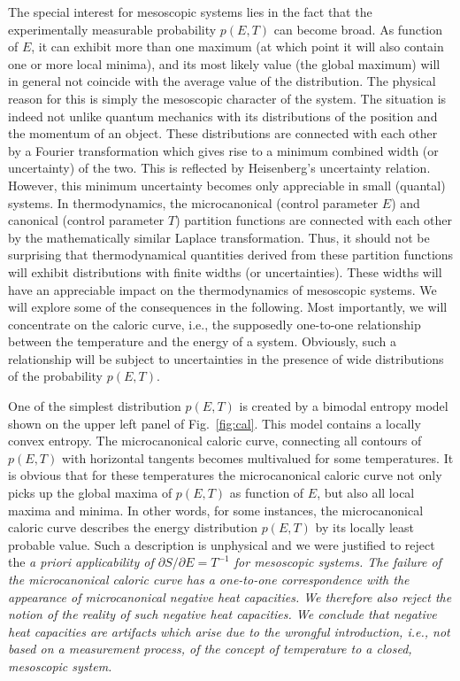 \documentclass[sort&compress,final,numberedheadings]{aipproc}
\begin{document}
The special interest for mesoscopic systems lies in the fact that the 
experimentally measurable probability $p(E,T)$ can become broad. As function of
$E$, it can exhibit more than one maximum (at which point it will also contain 
one or more local minima), and its most likely value (the global maximum) will 
in general not coincide with the average value of the distribution. The 
physical reason for this is simply the mesoscopic character of the system. The 
situation is indeed not unlike quantum mechanics with its distributions of the 
position and the momentum of an object. These distributions are connected with 
each other by a Fourier transformation which gives rise to a minimum combined 
width (or uncertainty) of the two. This is reflected by Heisenberg's 
uncertainty relation. However, this minimum uncertainty becomes only 
appreciable in small (quantal) systems. In thermodynamics, the microcanonical 
(control parameter $E$) and canonical (control parameter $T$) partition 
functions are connected with each other by the mathematically similar Laplace 
transformation. Thus, it should not be surprising that thermodynamical 
quantities derived from these partition functions will exhibit distributions 
with finite widths (or uncertainties). These widths will have an appreciable 
impact on the thermodynamics of mesoscopic systems. We will explore some of the
consequences in the following. Most importantly, we will concentrate on the 
caloric curve, i.e., the supposedly one-to-one relationship between the 
temperature and the energy of a system. Obviously, such a relationship will be 
subject to uncertainties in the presence of wide distributions of the 
probability $p(E,T)$.

One of the simplest distribution $p(E,T)$ is created by a bimodal entropy model
shown on the upper left panel of Fig.~\ref{fig:cal}. This model contains a 
locally convex entropy. The microcanonical caloric curve, connecting all 
contours of $p(E,T)$ with horizontal tangents becomes multivalued for some 
temperatures. It is obvious that for these temperatures the microcanonical 
caloric curve not only picks up the global maxima of $p(E,T)$ as function of 
$E$, but also all local maxima and minima. In other words, for some instances, 
the microcanonical caloric curve describes the energy distribution $p(E,T)$ by 
its locally least probable value. Such a description is unphysical and we were 
justified to reject the \em a priori \rm applicability of 
$\partial S/\partial E=T^{-1}$ for mesoscopic systems. The failure of the 
microcanonical caloric curve has a one-to-one correspondence with the 
appearance of microcanonical negative heat capacities. We therefore also reject
the notion of the reality of such negative heat capacities. We conclude that 
negative heat capacities are artifacts which arise due to the wrongful 
introduction, i.e., not based on a measurement process, of the concept of 
temperature to a closed, mesoscopic system.
\end{document}

